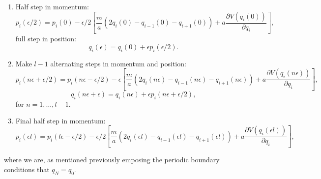 \documentclass[12pt]{article}
\begin{document}
            \begin{enumerate}
                \item Half step in momentum:
                \begin{equation}
                    \label{eq:MomentumInitialHalfStepQuadraticQHO}
                    p_i\left(\epsilon/2\right) = p_i\left(0\right) - \epsilon/2\left[\frac{m}{a}\left(2q_i\left(0\right)-q_{i-1}\left(0\right)-q_{i+1}\left(0\right)\right)+a\frac{\partial V\left(q_i\left(0\right)\right)}{\partial q_i}\right],
                \end{equation}
                full step in position:
                \begin{equation}
                    \label{eq:PositionInitialStepQuadraticQHO}
                    q_i\left(\epsilon\right) = q_i\left(0\right) + \epsilon p_i\left(\epsilon/2\right).
                \end{equation}
                \item Make $l-1$ alternating steps in momentum and position:
                \begin{equation}
                    \label{eq:MomentumFullStepQuadraticQHO}
                    p_i\left(n\epsilon+\epsilon/2\right) = p_i\left(n\epsilon-\epsilon/2\right) - \epsilon\left[\frac{m}{a}\left(2q_i\left(n\epsilon\right)-q_{i-1}\left(n\epsilon\right)-q_{i+1}\left(n\epsilon\right)\right)+a\frac{\partial V\left(q_i\left(n\epsilon\right)\right)}{\partial q_i}\right],
                \end{equation}
                \begin{equation}
                    \label{eq:PositionFullStepQuadraticQHO}
                    q_i\left(n\epsilon+\epsilon\right) = q_i\left(n\epsilon\right) + \epsilon p_i\left(n\epsilon+\epsilon/2\right),
                \end{equation}
                for $n = 1, \dots , l-1$.
                \item Final half step in momentum:
                \begin{equation}
                    \label{eq:MomnetumQuadraticKinetic}
                    p_i\left(\epsilon l\right) = p_i\left(l\epsilon-\epsilon/2\right) - \epsilon/2\left[\frac{m}{a}\left(2q_i\left(\epsilon l\right)-q_{i-1}\left(\epsilon l\right)-q_{i+1}\left(\epsilon l\right)\right)+a\frac{\partial V\left(q_i\left(\epsilon l\right)\right)}{\partial q_i}\right],
                \end{equation}
            \end{enumerate}
            where we are, as mentioned previously emposing the periodic boundary conditions that $q_N=q_0$.
\end{document}
